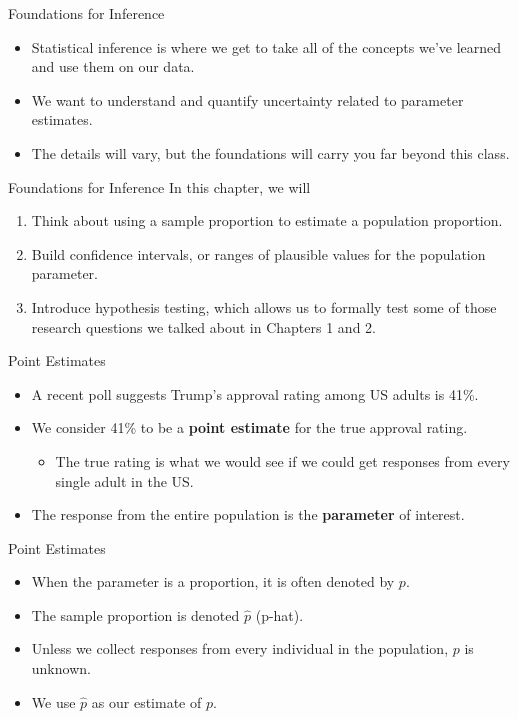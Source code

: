 \begin{frame}{Foundations for Inference}
    \begin{itemize}
        \item Statistical inference is where we get to take all of the concepts we've learned and use them on our data.
        \item We want to understand and quantify uncertainty related to parameter estimates.
        \item The details will vary, but the foundations will carry you far beyond this class.
    \end{itemize}
\end{frame}

\begin{frame}{Foundations for Inference}
    In this chapter, we will
    \begin{enumerate}
        \item Think about using a sample proportion to estimate a population proportion.
        \item Build confidence intervals, or ranges of plausible values for the population parameter.
        \item Introduce hypothesis testing, which allows us to formally test some of those research questions we talked about in Chapters 1 and 2.
    \end{enumerate}
\end{frame}

\begin{frame}{Point Estimates}
    \begin{itemize}
        \item A recent poll suggests Trump’s approval rating among US adults is 41\%. 
        \item We consider 41\% to be a \textbf{point estimate} for the true approval rating.
        \begin{itemize}
            \item The true rating is what we would see if we could get responses from every single adult in the US. 
        \end{itemize}
        \item The response from the entire population is the \textbf{parameter} of interest.
    \end{itemize}
\end{frame}

\begin{frame}{Point Estimates}
    \begin{itemize}
        \item When the parameter is a proportion, it is often denoted by $p$.
        \item The sample proportion is denoted $\hat{p}$ (p-hat). 
        \item Unless we collect responses from every individual in the population, $p$ is unknown.
        \item We use $\hat{p}$ as our estimate of $p$. 
    \end{itemize}
\end{frame}

